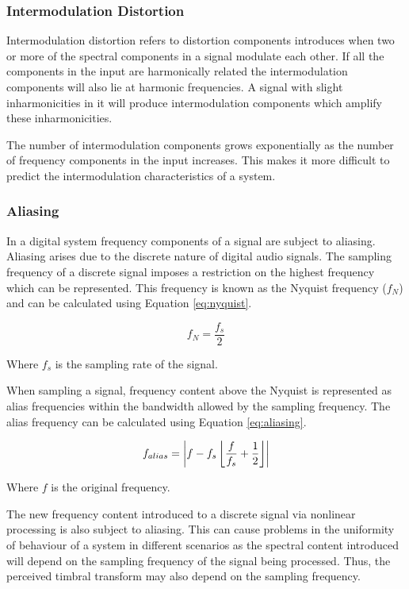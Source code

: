 		\subsubsection*{Intermodulation Distortion}
			Intermodulation distortion refers to distortion components introduces when two or more of the
			spectral components in a signal modulate each other. If all the components in the input are
			harmonically related the intermodulation components will also lie at harmonic frequencies. A signal
			with slight inharmonicities in it will produce intermodulation components which amplify these
			inharmonicities.

			The number of intermodulation components grows exponentially as the number of frequency components
			in the input increases. This makes it more difficult to predict the intermodulation characteristics
			of a system.

		\subsubsection*{Aliasing}
			In a digital system frequency components of a signal are subject to aliasing. Aliasing arises due
			to the discrete nature of digital audio signals. The sampling frequency of a discrete signal imposes
			a restriction on the highest frequency which can be represented. This frequency is known as the
			Nyquist frequency ($f_{N}$) and can be calculated using Equation \ref{eq:nyquist}.

			\begin{equation}
				f_{N} = \frac{f_{s}}{2}
				\label{eq:nyquist}
			\end{equation}

			Where $f_{s}$ is the sampling rate of the signal.

			When sampling a signal, frequency content above the Nyquist is represented as alias frequencies
			within the bandwidth allowed by the sampling frequency. The alias frequency can be calculated using
			Equation \ref{eq:aliasing}.

			\begin{equation}
				f_{alias} = \left|f - f_{s}\left\lfloor\frac{f}{f_{s}} + \frac{1}{2}\right\rfloor\right|
				\label{eq:aliasing}
			\end{equation}

			Where $f$ is the original frequency.

			The new frequency content introduced to a discrete signal via nonlinear processing is also subject
			to aliasing. This can cause problems in the uniformity of behaviour of a system in different
			scenarios as the spectral content introduced will depend on the sampling frequency of the signal
			being processed. Thus, the perceived timbral transform may also depend on the sampling frequency.

